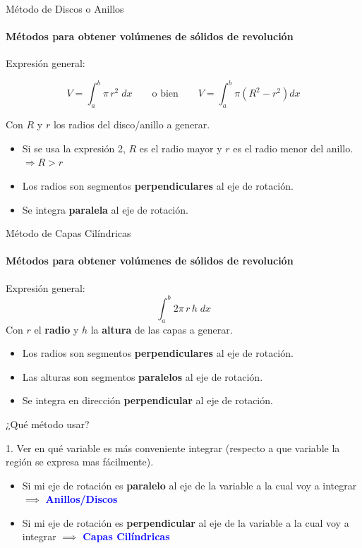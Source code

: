 \documentclass{plantillaPPT}
\begin{document}
\primeraDiapo


\begin{frame}{Método de Discos o Anillos}
\framesubtitle{Métodos para obtener volúmenes de sólidos de revolución}

Expresión general:

\[V = \int_{a}^{b} \pi \, r^2\; dx \qquad\text{o bien}\qquad V=\int_{a}^{b}\pi (R^2-r^2)dx\]

Con \(R\) y \(r\) los radios del disco/anillo a generar.\\ \vspace{0.2cm}
\begin{itemize}
    \item Si se usa la expresión 2, \(R\) es el radio mayor y \(r\) es el radio menor del anillo. \(\Rightarrow R>r\)
    \item Los radios son segmentos \textbf{perpendiculares} al eje de rotación.
    \item Se integra \textbf{paralela} al eje de rotación.
\end{itemize}

\end{frame}

\begin{frame}{Método de Capas Cilíndricas}
\framesubtitle{Métodos para obtener volúmenes de sólidos de revolución}

Expresión general:
\[\int_{a}^{b} 2\pi \,r\, h \; dx\]
Con \textbf{\(r\)} el \textbf{radio} y \textbf{\(h\)} la \textbf{altura} de las capas a generar. \\ \vspace{0.2cm}
\begin{itemize}
    \item Los radios son segmentos \textbf{perpendiculares} al eje de rotación. 
    \item Las alturas son segmentos \textbf{paralelos} al eje de rotación.
    \item Se integra en dirección \textbf{perpendicular} al eje de rotación.
\end{itemize}
\end{frame}

\begin{frame}{¿Qué método usar?}

1. Ver en qué variable es más conveniente integrar (respecto a que variable la región se expresa mas fácilmente).

\vspace{1cm}

\begin{itemize}
    \item Si mi eje de rotación es \textbf{paralelo} al eje de la variable a la cual voy a integrar \(\implies\) \textcolor{blue}{\textbf{Anillos/Discos}}
    \item Si mi eje de rotación es \textbf{perpendicular} al eje de la variable a la cual voy a integrar \(\implies\) \textcolor{blue}{\textbf{Capas Cilíndricas}}
\end{itemize}
    
\end{frame}
\end{document}
